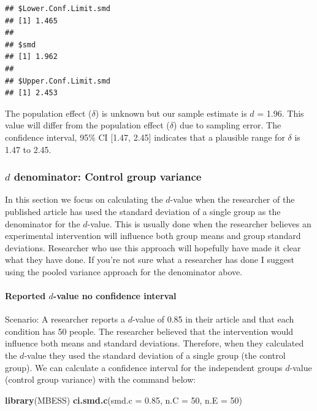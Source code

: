 \documentclass[
]{krantz}
\makeatletter
\newenvironment{Shaded}{\begin{snugshade}}{\end{snugshade}}
\newcommand{\DataTypeTok}[1]{\textcolor[rgb]{0.27,0.27,0.27}{#1}}
\newcommand{\DecValTok}[1]{\textcolor[rgb]{0.06,0.06,0.06}{#1}}
\newcommand{\FloatTok}[1]{\textcolor[rgb]{0.06,0.06,0.06}{#1}}
\newcommand{\KeywordTok}[1]{\textcolor[rgb]{0.27,0.27,0.27}{\textbf{#1}}}
\newcommand{\NormalTok}[1]{#1}
\newenvironment{kframe}{%
\medskip{}
\setlength{\fboxsep}{.8em}
 \def\at@end@of@kframe{}%
 \ifinner\ifhmode%
  \def\at@end@of@kframe{\end{minipage}}%
  \begin{minipage}{\columnwidth}%
 \fi\fi%
 \def\FrameCommand##1{\hskip\@totalleftmargin \hskip-\fboxsep
 \colorbox{shadecolor}{##1}\hskip-\fboxsep
     \hskip-\linewidth \hskip-\@totalleftmargin \hskip\columnwidth}%
 \MakeFramed {\advance\hsize-\width
   \@totalleftmargin\z@ \linewidth\hsize
   \@setminipage}}%
 {\par\unskip\endMakeFramed%
 \at@end@of@kframe}
\renewenvironment{Shaded}{\begin{kframe}}{\end{kframe}}
\makeatother
\begin{document}
\begin{verbatim}
## $Lower.Conf.Limit.smd
## [1] 1.465
## 
## $smd
## [1] 1.962
## 
## $Upper.Conf.Limit.smd
## [1] 2.453
\end{verbatim}

The population effect (\(\delta\)) is unknown but our sample estimate is \(d\) = 1.96. This value will differ from the population effect (\(\delta\)) due to sampling error. The confidence interval, 95\% CI {[}1.47, 2.45{]} indicates that a plausible range for \(\delta\) is 1.47 to 2.45.

\hypertarget{d-denominator-control-group-variance}{%
\subsubsection{\texorpdfstring{\(d\) denominator: Control group variance}{d denominator: Control group variance}}\label{d-denominator-control-group-variance}}

In this section we focus on calculating the \(d\)-value when the researcher of the published article has used the standard deviation of a single group as the denominator for the \(d\)-value. This is usually done when the researcher believes an experimental intervention will influence both group means and group standard deviations. Researcher who use this approach will hopefully have made it clear what they have done. If you're not sure what a researcher has done I suggest using the pooled variance approach for the denominator above.

\hypertarget{reported-d-value-no-confidence-interval-1}{%
\paragraph{\texorpdfstring{Reported \(d\)-value no confidence interval}{Reported d-value no confidence interval}}\label{reported-d-value-no-confidence-interval-1}}

Scenario: A researcher reports a \(d\)-value of 0.85 in their article and that each condition has 50 people. The researcher believed that the intervention would influence both means and standard deviations. Therefore, when they calculated the \(d\)-value they used the standard deviation of a single group (the control group). We can calculate a confidence interval for the independent groups \(d\)-value (control group variance) with the command below:

\begin{Shaded}
\begin{Highlighting}[]
\KeywordTok{library}\NormalTok{(MBESS)}
\KeywordTok{ci.smd.c}\NormalTok{(}\DataTypeTok{smd.c =} \FloatTok{0.85}\NormalTok{, }\DataTypeTok{n.C =} \DecValTok{50}\NormalTok{, }\DataTypeTok{n.E =} \DecValTok{50}\NormalTok{) }
\end{Highlighting}
\end{Shaded}
\end{document}
